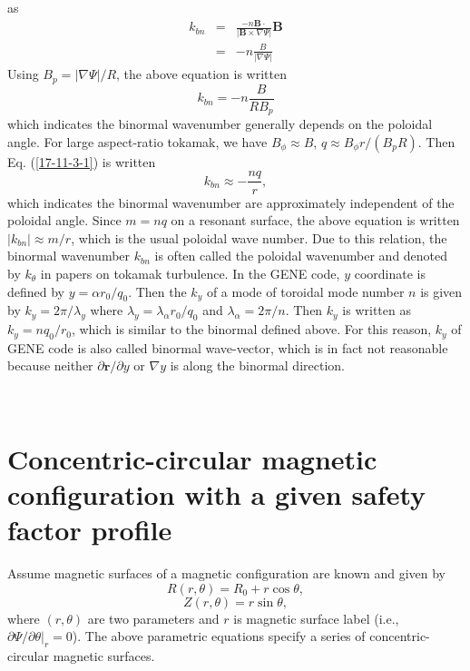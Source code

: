 \documentclass{llncs}
\newcommand{\nobracket}{}
\begin{document}
as
\begin{eqnarray*}
  k_{b n} & = & \frac{- n\mathbf{B} \cdot}{| \mathbf{B} \times \nabla \Psi |}
  \mathbf{B}\\
  & = & - n \frac{B}{| \nabla \Psi |}
\end{eqnarray*}
Using $B_p = | \nabla \Psi | / R$, the above equation is written
\begin{equation}
  \label{17-11-3-1} k_{b n} = - n \frac{B}{R B_p}
\end{equation}
which indicates the binormal wavenumber generally depends on the poloidal
angle. For large aspect-ratio tokamak, we have $B_{\phi} \approx B$, $q
\approx B_{\phi} r / (B_p R)$. Then Eq. (\ref{17-11-3-1}) is written
\begin{equation}
  k_{b n} \approx - \frac{n q}{r},
\end{equation}
which indicates the binormal wavenumber are approximately independent of the
poloidal angle. Since $m = n q$ on a resonant surface, the above equation is
written $| k_{b n} | \approx m / r$, which is the usual poloidal wave number.
Due to this relation, the binormal wavenumber $k_{b n}$ is often called the
poloidal wavenumber and denoted by $k_{\theta}$ in papers on tokamak
turbulence. In the GENE code, $y$ coordinate is defined by $y = \alpha r_0 /
q_0$. Then the $k_y$ of a mode of toroidal mode number $n$ is given by $k_y =
2 \pi / \lambda_y$ where $\lambda_y = \lambda_{\alpha} r_0 / q_0$ and
$\lambda_{\alpha} = 2 \pi / n$. Then $k_y$ is written as $k_y = n q_0 / r_0$,
which is similar to the binormal defined above. For this reason, $k_y$ of GENE
code is also called binormal wave-vector, which is in fact not reasonable
because neither $\partial \mathbf{r}/ \partial y$ or $\nabla y$ is along the
binormal direction.

\

\section{Concentric-circular magnetic configuration with a given safety
factor profile}\label{19-4-8-p1}

Assume magnetic surfaces of a magnetic configuration are known and given by
\begin{equation}
  R (r, \theta) = R_0 + r \cos \theta,
\end{equation}
\begin{equation}
  Z (r, \theta) = r \sin \theta,
\end{equation}
where $(r, \theta)$ are two parameters and $r$ is magnetic surface label
(i.e., $\partial \Psi / \partial \theta |_r = 0 \nobracket$). The above
parametric equations specify a series of concentric-circular magnetic
surfaces.
\end{document}
